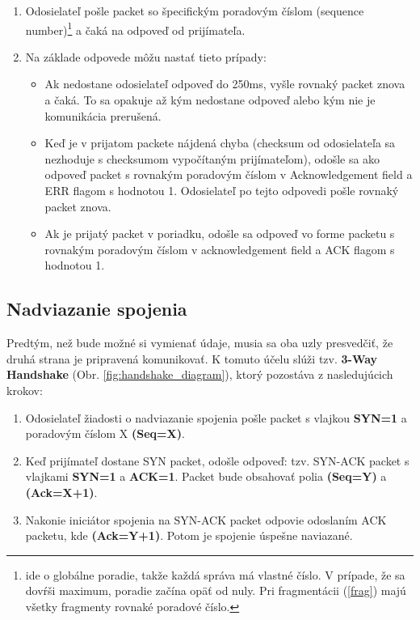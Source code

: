 \documentclass[a4paper,12pt]{article}
\begin{document}
    \begin{enumerate}
        \item Odosielateľ pošle packet so špecifickým poradovým číslom (sequence number)\footnote{ide o globálne poradie, takže každá správa má vlastné číslo. V prípade, že sa dovŕši maximum, poradie začína opäť od nuly. Pri fragmentácii (\ref{frag}) majú všetky fragmenty rovnaké poradové číslo.} a čaká na odpoveď od prijímateľa. 
	\item Na základe odpovede môžu nastať tieto prípady:	
	\begin{itemize}        
		\item Ak nedostane odosielateľ odpoveď do 250ms, vyšle rovnaký packet znova a čaká. To sa opakuje až kým nedostane odpoveď alebo kým nie je komunikácia prerušená.
		\item Keď je v prijatom packete nájdená chyba (checksum od odosielateľa sa nezhoduje s checksumom vypočítaným prijímateľom), odošle sa ako odpoveď packet s rovnakým poradovým číslom v Acknowledgement field a ERR flagom s hodnotou 1. Odosielateľ po tejto odpovedi pošle rovnaký packet znova.
	        \item Ak je prijatý packet v poriadku, odošle sa odpoveď vo forme packetu s rovnakým poradovým číslom v acknowledgement field a ACK flagom s hodnotou 1.
   	\end{itemize}
    \end{enumerate}

    \subsection{Nadviazanie spojenia}
	Predtým, než bude možné si vymienať údaje, musia sa oba uzly presvedčiť, že druhá strana je pripravená komunikovať. K tomuto účelu slúži tzv. \textbf{3-Way Handshake} (Obr. \ref{fig:handshake_diagram}), ktorý pozostáva z nasledujúcich krokov:
	
	\begin{enumerate}
	    \item 
		Odosielateľ žiadosti o nadviazanie spojenia pošle packet s vlajkou \textbf{SYN=1} a poradovým číslom X \textbf{(Seq=X)}.
	    \item 
		Keď prijímateľ dostane SYN packet, odošle odpoveď: tzv. SYN-ACK packet s vlajkami \textbf{SYN=1} a \textbf{ACK=1}. Packet bude obsahovať polia \textbf{(Seq=Y)} a \textbf{(Ack=X+1)}.
	    \item 
		Nakonie iniciátor spojenia na SYN-ACK packet odpovie odoslaním ACK packetu, kde \textbf{(Ack=Y+1)}. Potom je spojenie úspešne naviazané.
	\end{enumerate}
\end{document}
